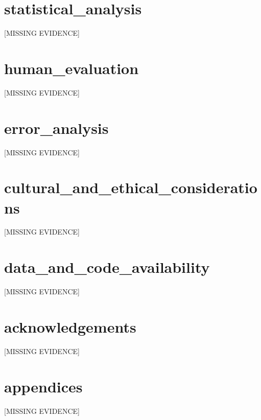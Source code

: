 \section{statistical_analysis}
[MISSING EVIDENCE]

\section{human_evaluation}
[MISSING EVIDENCE]

\section{error_analysis}
[MISSING EVIDENCE]

\section{cultural_and_ethical_considerations}
[MISSING EVIDENCE]

\section{data_and_code_availability}
[MISSING EVIDENCE]

\section{acknowledgements}
[MISSING EVIDENCE]

\section{appendices}
[MISSING EVIDENCE]

